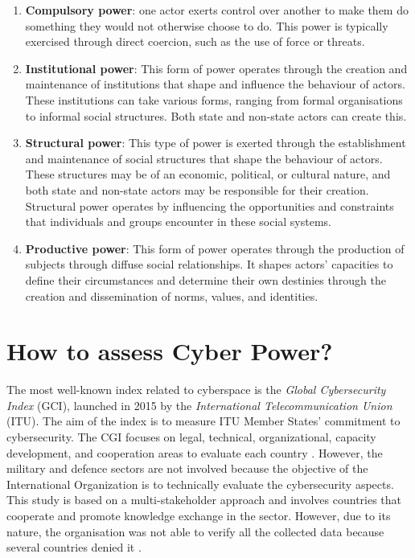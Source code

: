 \begin{enumerate}
    \item \textbf{Compulsory power}: one actor exerts control over another to make them do something they would not otherwise choose to do. This power is typically exercised through direct coercion, such as the use of force or threats.
    \item \textbf{Institutional power}: This form of power operates through the creation and maintenance of institutions that shape and influence the behaviour of actors. These institutions can take various forms, ranging from formal organisations to informal social structures. Both state and non-state actors can create this.
    \item \textbf{Structural power}: This type of power is exerted through the establishment and maintenance of social structures that shape the behaviour of actors. These structures may be of an economic, political, or cultural nature, and both state and non-state actors may be responsible for their creation. Structural power operates by influencing the opportunities and constraints that individuals and groups encounter in these social systems.
    \item \textbf{Productive power}: This form of power operates through the production of subjects through diffuse social relationships. It shapes actors’ capacities to define their circumstances and determine their own destinies through the creation and dissemination of norms, values, and identities.
\end{enumerate}
        

\section{How to assess Cyber Power?}

The most well-known index related to cyberspace is the \textit{Global Cybersecurity Index} (GCI), launched in 2015 by the \textit{International Telecommunication Union} (ITU). The aim of the index is to measure ITU Member States’ commitment to cybersecurity. The CGI focuses on legal, technical, organizational, capacity development, and cooperation areas to evaluate each country \autocite{internationaltelecommunicationunion_2020_global}. However, the military and defence sectors are not involved because the objective of the International Organization is to technically evaluate the cybersecurity aspects. This study is based on a multi-stakeholder approach and involves countries that cooperate and promote knowledge exchange in the sector. However, due to its nature, the organisation was not able to verify all the collected data because several countries denied it \autocite[viii]{internationaltelecommunicationunion_2020_global}. 

